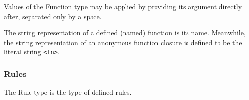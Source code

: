 Values of the Function type may be applied by providing its argument directly after,
separated only by a space.

The string representation of a defined (named) function is its name. Meanwhile, the
string representation of an anonymous function closure is defined to be the literal
string \texttt{<fn>}.

\subsubsection{Rules}

The Rule type is the type of defined rules.
